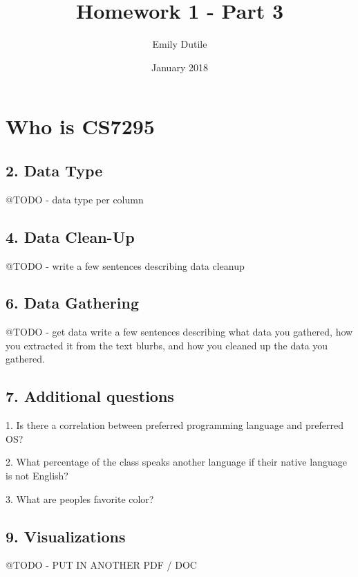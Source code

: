 \documentclass{neu_handout}
\title{Homework 1 - Part 3}
\author{Emily Dutile}
\date{January 2018}
\begin{document}
\section*{Who is CS7295}

\subsection*{2. Data Type}
 @TODO - data type per column


\subsection*{4. Data Clean-Up}
@TODO - write a few sentences describing data cleanup

\subsection*{6. Data Gathering}
@TODO - get data  write a few sentences describing what data you gathered, how you extracted it from the text blurbs, and how you cleaned up the data you gathered.

\subsection*{7. Additional questions}
1. Is there a correlation between preferred programming language and preferred OS?

2. What percentage of the class speaks another language if their native language is not English?

3. What are peoples favorite color?

\subsection*{9. Visualizations}
@TODO - PUT IN ANOTHER PDF / DOC
\end{document}
